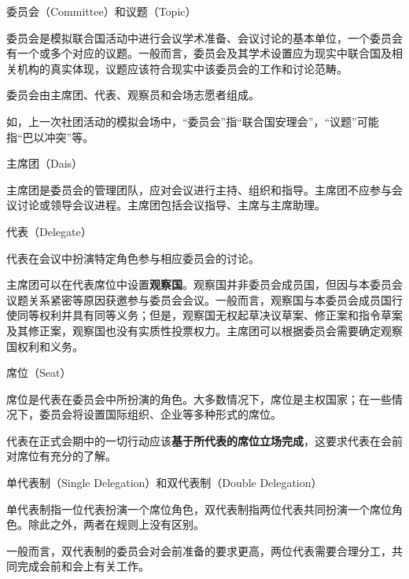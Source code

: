 \documentclass{beamer}
\begin{document}
\begin{frame}{委员会（Committee）和议题（Topic）}

委员会是模拟联合国活动中进行会议学术准备、会议讨论的基本单位，一个委员会有一个或多个对应的议题。一般而言，委员会及其学术设置应为现实中联合国及相关机构的真实体现，议题应该符合现实中该委员会的工作和讨论范畴。

委员会由主席团、代表、观察员和会场志愿者组成。

如，上一次社团活动的模拟会场中，“委员会”指“联合国安理会”，“议题”可能指“巴以冲突”等。

\end{frame}

\begin{frame}{主席团（Dais）}

主席团是委员会的管理团队，应对会议进行主持、组织和指导。主席团不应参与会议讨论或领导会议进程。主席团包括会议指导、主席与主席助理。

\end{frame}

\begin{frame}{代表（Delegate）}

代表在会议中扮演特定角色参与相应委员会的讨论。

主席团可以在代表席位中设置\textbf{观察国}。观察国并非委员会成员国，但因与本委员会议题关系紧密等原因获邀参与委员会会议。一般而言，观察国与本委员会成员国行使同等权利并具有同等义务；但是，观察国无权起草决议草案、修正案和指令草案及其修正案，观察国也没有实质性投票权力。主席团可以根据委员会需要确定观察国权利和义务。

\end{frame}

\begin{frame}{席位（Seat）}

席位是代表在委员会中所扮演的角色。大多数情况下，席位是主权国家；在一些情况下，委员会将设置国际组织、企业等多种形式的席位。

代表在正式会期中的一切行动应该\textbf{基于所代表的席位立场完成}，这要求代表在会前对席位有充分的了解。

\end{frame}

\begin{frame}{单代表制（Single Delegation）和双代表制（Double Delegation）}

单代表制指一位代表扮演一个席位角色，双代表制指两位代表共同扮演一个席位角色。除此之外，两者在规则上没有区别。

一般而言，双代表制的委员会对会前准备的要求更高，两位代表需要合理分工，共同完成会前和会上有关工作。

\end{frame}
\end{document}
